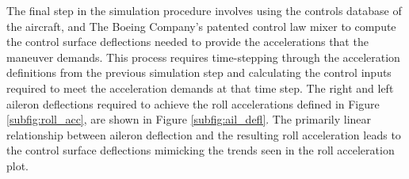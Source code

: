 The final step in the simulation procedure involves using the controls database of the aircraft, and The Boeing Company's patented control law mixer \cite{control_law_patent} to compute the control surface deflections needed to provide the accelerations that the maneuver demands.
This process requires time-stepping through the acceleration definitions from the previous simulation step and calculating the control inputs required to meet the acceleration demands at that time step. 
The right and left aileron deflections required to achieve the roll accelerations defined in Figure \ref{subfig:roll_acc}, are shown in Figure \ref{subfig:ail_defl}.
The primarily linear relationship between aileron deflection and the resulting roll acceleration leads to the control surface deflections mimicking the trends seen in the roll acceleration plot. 


